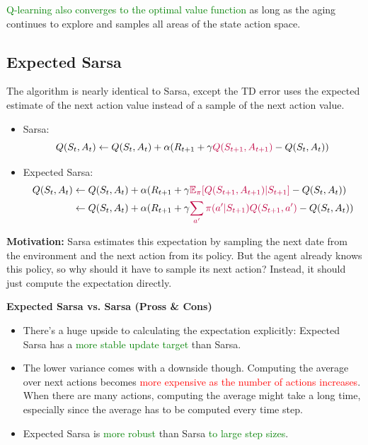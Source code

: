 \documentclass[12pt, a4paper]{article}
\begin{document}
\textcolor{Green}{Q-learning also converges to the optimal value function} as long as the aging continues to explore and samples all areas of the state action space.











\subsection{Expected Sarsa}\label{expected-sarsa}

The algorithm is nearly identical to Sarsa, except the TD error uses the expected estimate of the next action value instead of a sample of the next action value.
\begin{itemize}
  \item Sarsa:
  $$
  Q(S_t, A_t) \leftarrow Q(S_t, A_t) + \alpha (R_{t+1} + \gamma \textcolor{purple}{Q(S_{t+1}, A_{t+1})} - Q(S_t, A_t))
  $$
  \item Expected Sarsa:
  \begin{align*}
    Q(S_t, A_t) &\leftarrow Q(S_t, A_t) + \alpha (R_{t+1} + \gamma \textcolor{purple}{\mathbb{E}_\pi [Q(S_{t+1}, A_{t+1}) | S_{t+1}]} - Q(S_t, A_t)) \\
    &\leftarrow Q(S_t, A_t) + \alpha (R_{t+1} + \gamma \textcolor{purple}{\sum_{a'} \pi(a' | S_{t+1}) Q(S_{t+1}, a')} - Q(S_t, A_t))
  \end{align*}
\end{itemize}


\textbf{Motivation:} Sarsa estimates this expectation by sampling the next date from the environment and the next action from its policy. But the agent already knows this policy, so why should it have to sample its next action? Instead, it should just compute the expectation directly.

\textbf{Expected Sarsa vs. Sarsa (Pross \& Cons)}
\begin{itemize}
  \item There's a huge upside to calculating the expectation explicitly: Expected Sarsa has a \textcolor{Green}{more stable update target} than Sarsa.
  \item The lower variance comes with a downside though. Computing the average over next actions becomes \textcolor{red}{more expensive as the number of actions increases}. When there are many actions, computing the average might take a long time, especially since the average has to be computed every time step.
  \item Expected Sarsa is \textcolor{Green}{more robust} than Sarsa \textcolor{Green}{to large step sizes}.
\end{itemize}
\end{document}
